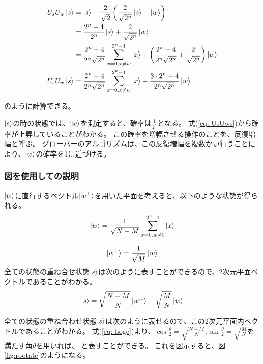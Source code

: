 \begin{equation}
    \label{eq:UsUws}
    \begin{split}
        U_s U_w \ket{s} &= \ket{s} - \frac{2}{\sqrt{2}} \left( \frac{2}{\sqrt{2^n}} \ket{s} - \ket{w} \right)\\
        &= \frac{2^n - 4}{2^n} \ket{s} + \frac{2}{\sqrt{2^n}} \ket{w}\\
        &= \frac{2^n - 4}{2^n \sqrt{2^n}} \sum_{x = 0, x \ne w}^{2^n - 1} \ket{x} + \left( \frac{2^n - 4}{2^n \sqrt{2^n}} + \frac{2}{\sqrt{2^n}} \right) \ket{w}\\
        U_s U_w \ket{s} &= \frac{2^n - 4}{2^n \sqrt{2^n}} \sum_{x = 0, x \ne w}^{2^n - 1} \ket{x} + \frac{3 \cdot 2^n - 4}{2^n \sqrt{2^n}} \ket{w}
    \end{split}
\end{equation}

のように計算できる。

$\ket{s}$の時の状態では、$\ket{w}$を測定すると、確率は$\frac{1}{2^n}$となる。
式(\ref{eq: UsUws})から確率が上昇していることがわかる。
この確率を増幅させる操作のことを、反復増幅と呼ぶ。
グローバーのアルゴリズムは、この反復増幅を複数かい行うことにより、$\ket{w}$の確率を1に近づける。


\subsubsection{図を使用しての説明}

$\ket{w}$に直行するベクトル$\ket{w^{\perp}}$を用いた平面を考えると、以下のような状態が得られる。
\begin{equation}
    \ket{w} = \frac{1}{\sqrt{N - M}} \sum^{2^n - 1}_{x = 0, w \neq 0} \ket{x}
\end{equation}

\begin{equation}
    \ket{w^{\perp}} = \frac{1}{\sqrt{M}} \ket{w}
\end{equation}
全ての状態の重ね合せ状態$\ket{s}$は次のように表すことができるので、2次元平面ベクトルであることがわかる。
\begin{equation}
    \label{eq:hgoe}
    \ket{s} = \sqrt{\frac{N - M}{N}} \ket{w^{\perp}} + \sqrt{\frac{M}{N}}\ket{w}
\end{equation}

全ての状態の重ね合わせ状態$\ket{s}$は次のように表せるので、この2次元平面内ベクトルであることがわかる。
式(\ref{eq: hoge})より、$\cos{\frac{\theta}{2}} = \sqrt{\frac{N - M}{N}}, \sin{\frac{\theta}{2}} = \sqrt{\frac{M}{N}}$を満たす角$\theta$を用いれば、
と表すことができる。
これを図示すると、図\ref{fig:rootate}のようになる。

